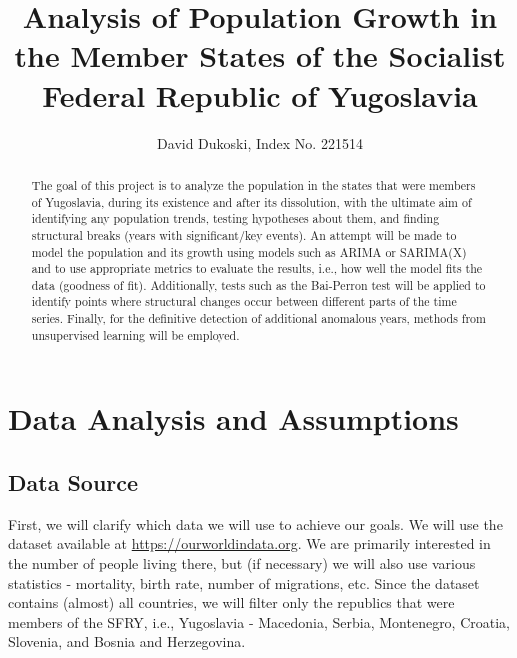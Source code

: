 \documentclass[a4paper,11pt]{article}
\title{Analysis of Population Growth in the Member States of the Socialist Federal Republic of Yugoslavia}
\author{David Dukoski, Index No. 221514}
\begin{document}
\maketitle
\begin{abstract}
The goal of this project is to analyze the population in the states that were members of Yugoslavia, during its existence and after its dissolution, with the ultimate aim of identifying any population trends, testing hypotheses about them, and finding structural breaks (years with significant/key events). An attempt will be made to model the population and its growth using models such as ARIMA or SARIMA(X) and to use appropriate metrics to evaluate the results, i.e., how well the model fits the data (goodness of fit). Additionally, tests such as the Bai-Perron test will be applied to identify points where structural changes occur between different parts of the time series. Finally, for the definitive detection of additional anomalous years, methods from unsupervised learning will be employed.
\end{abstract}
\section{Data Analysis and Assumptions}
\subsection{Data Source}
First, we will clarify which data we will use to achieve our goals. We will use the dataset available at \href{https://ourworldindata.org/explorers/population-and-demography?tab=table&time=earliest..2023&facet=none&hideControls=true&indicator=Population&Sex=Both+sexes&Age=Total&Projection+scenario=None&country=OWID_WRL~Africa+%28UN%29~Asia+%28UN%29~Northern+America+%28UN%29~Latin+America+and+the+Caribbean+%28UN%29~Europe+%28UN%29}{https://ourworldindata.org}. We are primarily interested in the number of people living there, but (if necessary) we will also use various statistics - mortality, birth rate, number of migrations, etc. Since the dataset contains (almost) all countries, we will filter only the republics that were members of the SFRY, i.e., Yugoslavia - Macedonia, Serbia, Montenegro, Croatia, Slovenia, and Bosnia and Herzegovina.
\end{document}
